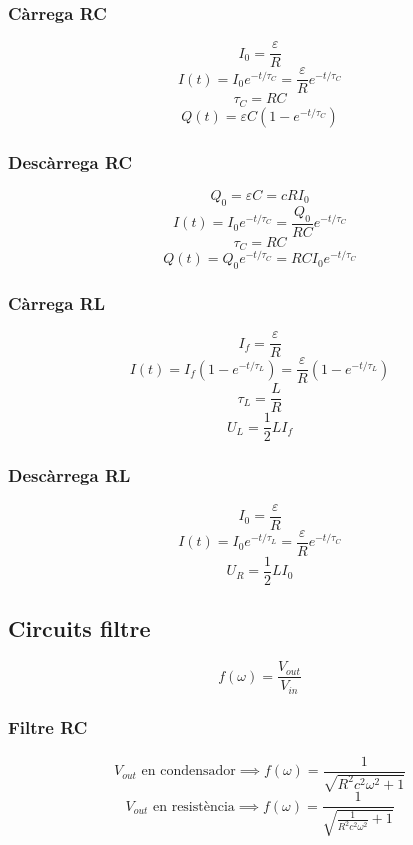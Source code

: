 \documentclass[10pt,twocolumn]{article}
\begin{document}
\subsubsection{Càrrega RC}
\[ I_0 = \frac{\varepsilon}{R} \]
\[ I\left(t\right) = I_0 e^{-t/\tau_C} = \frac{\varepsilon}{R} e^{-t/\tau_C} \]
\[ \tau_C = RC \]
\[ Q\left(t\right) = \varepsilon C\left(1-e^{-t/\tau_C}\right) \]
\subsubsection{Descàrrega RC}
\[ Q_0 = \varepsilon C = cRI_0 \]
\[ I\left(t\right) = I_0 e^{-t/\tau_C} = \frac{Q_0}{RC} e^{-t/\tau_C} \]
\[ \tau_C = RC \]
\[ Q\left(t\right) = Q_0 e^{-t/\tau_C} = RC I_0 e^{-t/\tau_C} \]
\subsubsection{Càrrega RL}
\[ I_f = \frac{\varepsilon}{R} \]
\[ I\left(t\right) = I_f \left(1-e^{-t/\tau_L}\right) = \frac{\varepsilon}{R} \left(1-e^{-t/\tau_L}\right) \]
\[ \tau_L = \frac{L}{R} \]
\[ U_L = \frac{1}{2}LI_f\]
\subsubsection{Descàrrega RL}
\[ I_0 = \frac{\varepsilon}{R} \]
\[ I\left(t\right) = I_0 e^{-t/\tau_L} = \frac{\varepsilon}{R} e^{-t/\tau_C} \]
\[ U_R = \frac{1}{2}LI_0\]
\subsection{Circuits filtre}
\[ f\left(\omega\right) = \frac{V_{out}}{V_{in}} \]
\subsubsection{Filtre RC}
\[ V_{out} \text{ en condensador} \implies f\left(\omega\right) = \frac{1}{\sqrt{R^2c^2\omega^2+1}} \]
\[ V_{out} \text{ en resistència} \implies f\left(\omega\right) = \frac{1}{\sqrt{\frac{1}{R^2c^2\omega^2}+1}} \]
\end{document}

